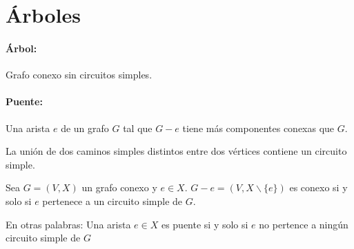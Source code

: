 \newpage
\section{{Árboles}}
\paragraph{Árbol:} Grafo conexo sin circuitos simples.

\paragraph{Puente:} Una arista \(e\) de un grafo \(G\) tal que \(G - e\) tiene más componentes conexas que \(G\).

\begin{lema}\label{unionCaminosSimplesEsCircuito}
	La unión de dos caminos simples distintos entre dos vértices contiene un circuito simple.
\end{lema}

\begin{lema}
	Sea \(G =(V, X)\) un grafo conexo y \(e\in X\). \(G-e = (V, X\backslash\{e\})\) es conexo si y solo si \(e\) pertenece a un circuito simple de \(G\).
	
	En otras palabras: Una arista \(e\in X\) es puente si y solo si \(e\) no pertence a ningún circuito simple de \(G\)
\end{lema}


